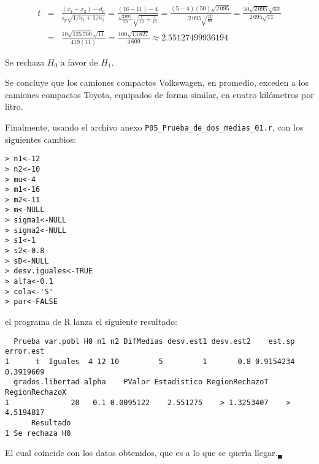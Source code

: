 \begin{solucion}
 \begin{estadistico}
  \begin{eqnarray*}
   t & = & 
   \frac{
   \left( \bar{x}_1 - \bar{x}_2 \right) - d_0
   }{
   s_p\sqrt{1/n_1 + 1/n_2}
   }
   = \frac{(16-11)-4}{\frac{\sqrt{2\,095}}{50}\sqrt{\frac{1}{12}+\frac{1}{10}}}
   = \frac{(5-4)(50)\sqrt{2\,095}}{2\,095\sqrt{\frac{11}{60}}}
   = \frac{50\sqrt{2\,095}\sqrt{60}}{2\,095\sqrt{11}} \\
   & = & \frac{10\sqrt{125\,700}\sqrt{11}}{419(11)}
   = \frac{100\sqrt{13\,827}}{4\,609}
   \approx 2.55127499936194
  \end{eqnarray*}
 \end{estadistico}

 \begin{decision}
  Se rechaza $H_0$ a favor de $H_1$.
 \end{decision}

 \begin{conclusion}
  Se concluye que los camiones compactos Volkswagen, en promedio, exceden a los camiones compactos Toyota, equipados de forma similar, en cuatro kil\'ometros por litro.
 \end{conclusion}

 Finalmente, usando el archivo anexo
 \texttt{P05\_Prueba\_de\_dos\_medias\_01.r},
 con los siguientes cambios:
 \begin{verbatim}
> n1<-12
> n2<-10
> mu<-4
> m1<-16
> m2<-11
> m<-NULL
> sigma1<-NULL
> sigma2<-NULL
> s1<-1
> s2<-0.8
> sD<-NULL
> desv.iguales<-TRUE
> alfa<-0.1
> cola<-'S'
> par<-FALSE
 \end{verbatim}
 \vspace{-0.5cm}
 el programa de R lanza el siguiente resultado:
 \begin{verbatim}
  Prueba var.pobl H0 n1 n2 DifMedias desv.est1 desv.est2    est.sp error.est
1      t  Iguales  4 12 10         5         1       0.8 0.9154234 0.3919609
  grados.libertad alpha    PValor Estadistico RegionRechazoT RegionRechazoX
1              20   0.1 0.0095122    2.551275    > 1.3253407    > 4.5194817
      Resultado
1 Se rechaza H0
 \end{verbatim}
 \vspace{-0.5cm}
 El cual coincide con los datos obtenidos,
 que es a lo que se quer\'{\i}a llegar.${}_{\blacksquare}$
\end{solucion}
